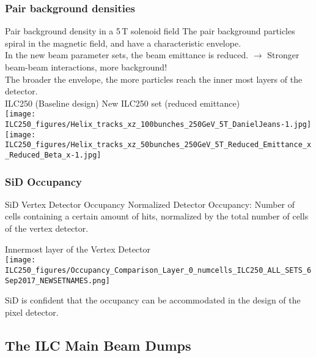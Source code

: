 \documentclass[xcolor={dvipsnames}]{beamer}
\begin{document}
\subsubsection{Pair background densities}
\begin{frame}{Pair background density in a 5\,T solenoid field}
The \alert{pair background particles spiral in the magnetic field}, and have a characteristic envelope.\\
In the new beam parameter sets, the \alert{beam emittance is reduced}. $\rightarrow$ Stronger beam-beam interactions, \alert{more background}!\\
The broader the envelope, the more particles reach the inner most layers of the detector.\\
\hspace*{1cm} ILC250 (Baseline design) \hfill New ILC250 set (reduced emittance)\hspace*{1cm}\\
\texttt{[image: ILC250\_figures/Helix\_tracks\_xz\_100bunches\_250GeV\_5T\_DanielJeans-1.jpg]}
\hspace*{0.1cm}
\texttt{[image: ILC250\_figures/Helix\_tracks\_xz\_50bunches\_250GeV\_5T\_Reduced\_Emittance\_x\_Reduced\_Beta\_x-1.jpg]}
\end{frame}

\subsubsection{SiD Occupancy}
\begin{frame}{SiD Vertex Detector Occupancy}
 Normalized Detector Occupancy: Number of cells containing a certain amount of hits, normalized by the total number of cells of the vertex detector.
\begin{center}
 Innermost layer of the Vertex Detector\\
 \texttt{[image: ILC250\_figures/Occupancy\_Comparison\_Layer\_0\_numcells\_ILC250\_ALL\_SETS\_6Sep2017\_NEWSETNAMES.png]}
\end{center}
SiD is confident that the occupancy can be accommodated in the design of the pixel detector.
\end{frame}

\subsection{The ILC Main Beam Dumps}
\end{document}
